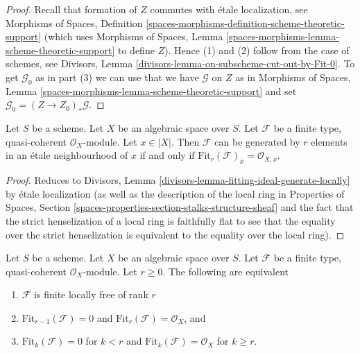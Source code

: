 \begin{proof}
Recall that formation of $Z$ commutes with \'etale localization, see
Morphisms of Spaces, Definition
\ref{spaces-morphisms-definition-scheme-theoretic-support}
(which uses Morphisms of Spaces, Lemma
\ref{spaces-morphisms-lemma-scheme-theoretic-support}
to define $Z$). Hence (1) and (2) follow from the case of schemes, see
Divisors, Lemma \ref{divisors-lemma-on-subscheme-cut-out-by-Fit-0}.
To get $\mathcal{G}_0$ as in part (3) we can use
that we have $\mathcal{G}$ on $Z$ as in Morphisms of Spaces, Lemma
\ref{spaces-morphisms-lemma-scheme-theoretic-support}
and set $\mathcal{G}_0 = (Z \to Z_0)_*\mathcal{G}$.
\end{proof}

\begin{lemma}
\label{lemma-fitting-ideal-generate-locally}
Let $S$ be a scheme. Let $X$ be an algebraic space over $S$.
Let $\mathcal{F}$ be a finite type, quasi-coherent
$\mathcal{O}_X$-module. Let $x \in |X|$. Then $\mathcal{F}$ can be
generated by $r$ elements in an \'etale neighbourhood of $x$ if and only
if $\text{Fit}_r(\mathcal{F})_{\overline{x}} = \mathcal{O}_{X, \overline{x}}$.
\end{lemma}

\begin{proof}
Reduces to
Divisors, Lemma \ref{divisors-lemma-fitting-ideal-generate-locally}
by \'etale localization (as well as the description of the local
ring in Properties of Spaces, Section
\ref{spaces-properties-section-stalks-structure-sheaf}
and the fact that the strict henselization of a local ring
is faithfully flat to see that the equality over the strict
henselization is equivalent to the equality over the local ring).
\end{proof}

\begin{lemma}
\label{lemma-fitting-ideal-finite-locally-free}
Let $S$ be a scheme. Let $X$ be an algebraic space over $S$.
Let $\mathcal{F}$ be a finite type, quasi-coherent
$\mathcal{O}_X$-module. Let $r \geq 0$. The following are equivalent
\begin{enumerate}
\item $\mathcal{F}$ is finite locally free of rank $r$
\item $\text{Fit}_{r - 1}(\mathcal{F}) = 0$ and
$\text{Fit}_r(\mathcal{F}) = \mathcal{O}_X$, and
\item $\text{Fit}_k(\mathcal{F}) = 0$ for $k < r$ and
$\text{Fit}_k(\mathcal{F}) = \mathcal{O}_X$ for $k \geq r$.
\end{enumerate}
\end{lemma}

